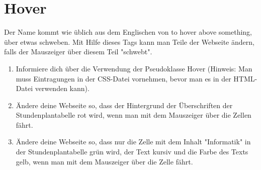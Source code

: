 \section{Hover}
Der Name kommt wie üblich aus dem Englischen von to hover above something, über etwas schweben. Mit Hilfe dieses Tags kann man Teile der Webseite ändern, falls der Mauszeiger über diesem Teil "schwebt". 

\begin{Exercise}[title=Erstelle deinen Stundenplan in \textit{stundenplan.html}, label=Hover1]
	\begin{enumerate}
		\item Informiere dich über die Verwendung der Pseudoklasse Hover (Hinweis: Man muss Eintragungen in der CSS-Datei vornehmen, bevor man es in der HTML-Datei verwenden kann).
		\item Ändere deine Webseite so, dass der Hintergrund der Überschriften der Stundenplantabelle rot wird, wenn man mit dem Mauszeiger über die Zellen fährt.
		\item Ändere deine Webseite so, dass nur die Zelle mit dem Inhalt "Informatik" in der Stundenplantabelle grün wird, der Text kursiv und die Farbe des Texts gelb, wenn man mit dem Mauszeiger über die Zelle fährt.
	\end{enumerate}
\end{Exercise}

